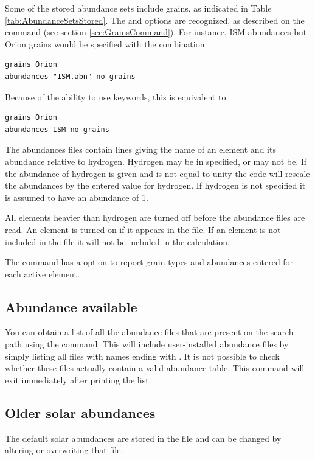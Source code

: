 Some of the stored abundance sets include grains, as indicated in Table \ref{tab:AbundanceSetsStored}.
The  and  options are recognized,
as described on the  command (see section \ref{sec:GrainsCommand}).
For instance, ISM abundances but Orion grains would be specified with the combination
\begin{verbatim}
grains Orion
abundances "ISM.abn" no grains
\end{verbatim}
Because of the ability to use keywords, this is equivalent to
\begin{verbatim}
grains Orion
abundances ISM no grains
\end{verbatim}

The abundances files contain lines giving the name of an element and its abundance relative 
to hydrogen. 
Hydrogen may be in specified, or may not be.  If the abundance of hydrogen is 
given and is not equal to unity the code will rescale the abundances by the entered value 
for hydrogen.  If hydrogen is not specified it is assumed to have an abundance
of 1.

All elements heavier than hydrogen are turned off before the abundance files are read.
An element is turned on if it appears in the file.
If an element is not included in the file it will not be included in the calculation.

The  command has a  option to report
grain types and abundances entered for each active element.

\subsection{Abundance available}

You can obtain a list of all the abundance files that are present on the search
path using the  command. This will include
user-installed abundance files by simply listing all files with names ending with .
It is not possible to check whether these files actually contain a valid abundance table.
This command will exit immediately after printing the list.

\subsection{Older solar abundances}

The default solar abundances are stored in the file 
 and can be changed
by altering or overwriting that file.

